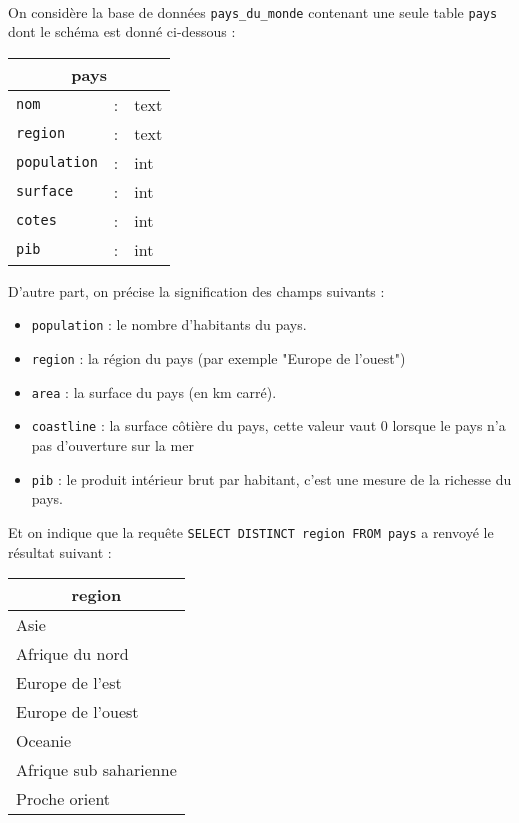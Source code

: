 \documentclass[11pt,a4paper]{article}
\begin{document}
\begin{Exercise}[title={requête {\sc sql} sur une seule table}]\\
	On considère la base de données {\tt pays\_du\_monde} contenant une seule table {\tt pays} dont le schéma est donné ci-dessous :
	\begin{center}
	\begin{tabular}{|lll|}
		\hline
		\multicolumn{3}{|c|}{\textbf{pays}} \\
		\hline
		{\tt nom} & : & {\sc text} \\
		\hline
		{\tt region} & : & {\sc text} \\
		\hline
		{\tt population} & : & {\sc int} \\
		\hline
		{\tt surface} & : & {\sc int} \\
		\hline
		{\tt cotes} & : & {\sc int} \\
		\hline
		{\tt pib} & : & {\sc int} \\
		\hline
		\end{tabular}
	\end{center}
	D'autre part, on précise la signification des champs suivants : 
	\begin{itemize}
		\item {\tt population} : le nombre d'habitants du pays.
		\item {\tt region} : la région du pays (par exemple "Europe de l'ouest")
		\item {\tt area} : la surface du pays (en km carré).
		\item {\tt coastline} : la surface côtière du pays, cette valeur vaut 0 lorsque le pays n'a pas d'ouverture sur la mer
		\item {\tt pib} : le produit intérieur brut par habitant, c'est une mesure de la richesse du pays.
		\end{itemize}
	Et on indique que la requête \texttt{SELECT DISTINCT region FROM pays} a renvoyé le résultat suivant : 
	\begin{center}
	\begin{tabular}{|l|}
		\hline
		\multicolumn{1}{|c|}{\textbf{region}} \\
		\hline
		Asie \\
		Afrique du nord \\
		Europe de l'est \\
		Europe de l'ouest \\
		Oceanie \\
		Afrique sub saharienne \\
		Proche orient\\

\end{tabular}
\end{center}
\end{Exercise}
\end{document}
